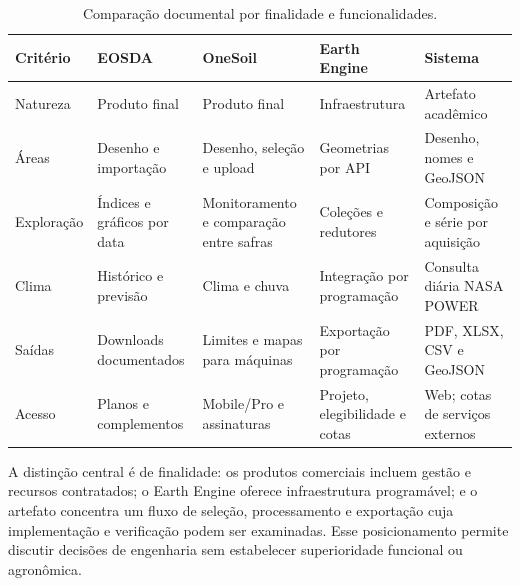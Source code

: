 \begin{table}[htbp]
\centering\small
\caption{Comparação documental por finalidade e funcionalidades.}
\label{tab:plataformas}
\setlength{\tabcolsep}{3pt}
\begin{tabular}{p{}p{}p{}p{}p{}}
\hline Critério & EOSDA & OneSoil & Earth Engine & Sistema\\ \hline
Natureza & Produto final & Produto final & Infraestrutura & Artefato acadêmico\\
Áreas & Desenho e importação & Desenho, seleção e upload & Geometrias por API & Desenho, nomes e GeoJSON\\
Exploração & Índices e gráficos por data & Monitoramento e comparação entre safras & Coleções e redutores & Composição e série por aquisição\\
Clima & Histórico e previsão & Clima e chuva & Integração por programação & Consulta diária NASA POWER\\
Saídas & Downloads documentados & Limites e mapas para máquinas & Exportação por programação & PDF, XLSX, CSV e GeoJSON\\
Acesso & Planos e complementos & Mobile/Pro e assinaturas & Projeto, elegibilidade e cotas & Web; cotas de serviços externos\\ \hline
\end{tabular}
\end{table}

A distinção central é de finalidade: os produtos comerciais incluem gestão e recursos contratados; o Earth Engine oferece infraestrutura programável; e o artefato concentra um fluxo de seleção, processamento e exportação cuja implementação e verificação podem ser examinadas. Esse posicionamento permite discutir decisões de engenharia sem estabelecer superioridade funcional ou agronômica.
